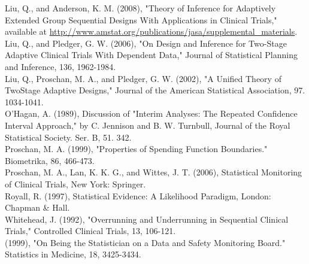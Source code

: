 \documentclass[10pt]{article}
\begin{document}
\begin{itemize}
Liu, Q., and Anderson, K. M. (2008), "Theory of Inference for Adaptively Extended Group Sequential Designs With Applications in Clinical Trials," available at \href{http://www.amstat.org/publications/jasa/supplemental_materials}{http://www.amstat.org/publications/jasa/supplemental\_materials}.\\
Liu, Q., and Pledger, G. W. (2006), "On Design and Inference for Two-Stage Adaptive Clinical Trials With Dependent Data," Journal of Statistical Planning and Inference, 136, 1962-1984.\\
Liu, Q., Proschan, M. A., and Pledger, G. W. (2002), "A Unified Theory of TwoStage Adaptive Designs," Journal of the American Statistical Association, 97. 1034-1041.\\
O'Hagan, A. (1989), Discussion of "Interim Analyses: The Repeated Confidence Interval Approach," by C. Jennison and B. W. Turnbull, Journal of the Royal Statistical Society. Ser. B, 51. 342.\\
Proschan, M. A. (1999), "Properties of Spending Function Boundaries." Biometrika, 86, 466-473.\\
Proschan, M. A., Lan, K. K. G., and Wittes, J. T. (2006), Statistical Monitoring of Clinical Trials, New York: Springer.\\
Royall, R. (1997), Statistical Evidence: A Likelihood Paradigm, London: Chapman \& Hall.\\
Whitehead, J. (1992), "Overrunning and Underrunning in Sequential Clinical Trials," Controlled Clinical Trials, 13, 106-121.\\
(1999), "On Being the Statistician on a Data and Safety Monitoring Board." Statistics in Medicine, 18, 3425-3434.
\end{itemize}
\end{document}

